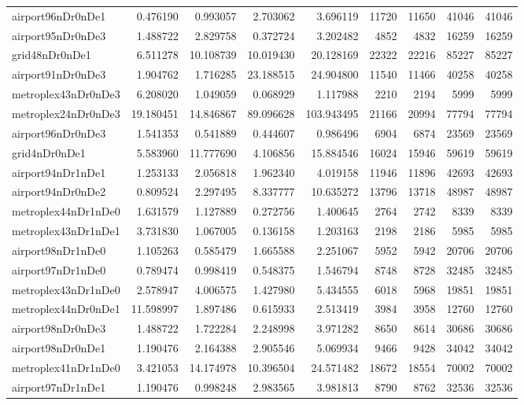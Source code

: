 \begin{longtable}{|l|r|r|r|r|r|r|r|r|}
airport96nDr0nDe1 & 0.476190 & 0.993057 & 2.703062 & 3.696119 & 11720 & 11650 & 41046 & 41046 \\
airport95nDr0nDe3 & 1.488722 & 2.829758 & 0.372724 & 3.202482 & 4852 & 4832 & 16259 & 16259 \\
grid48nDr0nDe1 & 6.511278 & 10.108739 & 10.019430 & 20.128169 & 22322 & 22216 & 85227 & 85227 \\
airport91nDr0nDe3 & 1.904762 & 1.716285 & 23.188515 & 24.904800 & 11540 & 11466 & 40258 & 40258 \\
metroplex43nDr0nDe3 & 6.208020 & 1.049059 & 0.068929 & 1.117988 & 2210 & 2194 & 5999 & 5999 \\
metroplex24nDr0nDe3 & 19.180451 & 14.846867 & 89.096628 & 103.943495 & 21166 & 20994 & 77794 & 77794 \\
airport96nDr0nDe3 & 1.541353 & 0.541889 & 0.444607 & 0.986496 & 6904 & 6874 & 23569 & 23569 \\
grid4nDr0nDe1 & 5.583960 & 11.777690 & 4.106856 & 15.884546 & 16024 & 15946 & 59619 & 59619 \\
airport94nDr1nDe1 & 1.253133 & 2.056818 & 1.962340 & 4.019158 & 11946 & 11896 & 42693 & 42693 \\
airport94nDr0nDe2 & 0.809524 & 2.297495 & 8.337777 & 10.635272 & 13796 & 13718 & 48987 & 48987 \\
metroplex44nDr1nDe0 & 1.631579 & 1.127889 & 0.272756 & 1.400645 & 2764 & 2742 & 8339 & 8339 \\
metroplex43nDr1nDe1 & 3.731830 & 1.067005 & 0.136158 & 1.203163 & 2198 & 2186 & 5985 & 5985 \\
airport98nDr1nDe0 & 1.105263 & 0.585479 & 1.665588 & 2.251067 & 5952 & 5942 & 20706 & 20706 \\
airport97nDr1nDe0 & 0.789474 & 0.998419 & 0.548375 & 1.546794 & 8748 & 8728 & 32485 & 32485 \\
metroplex43nDr1nDe0 & 2.578947 & 4.006575 & 1.427980 & 5.434555 & 6018 & 5968 & 19851 & 19851 \\
metroplex44nDr0nDe1 & 11.598997 & 1.897486 & 0.615933 & 2.513419 & 3984 & 3958 & 12760 & 12760 \\
airport98nDr0nDe3 & 1.488722 & 1.722284 & 2.248998 & 3.971282 & 8650 & 8614 & 30686 & 30686 \\
airport98nDr0nDe1 & 1.190476 & 2.164388 & 2.905546 & 5.069934 & 9466 & 9428 & 34042 & 34042 \\
metroplex41nDr1nDe0 & 3.421053 & 14.174978 & 10.396504 & 24.571482 & 18672 & 18554 & 70002 & 70002 \\
airport97nDr1nDe1 & 1.190476 & 0.998248 & 2.983565 & 3.981813 & 8790 & 8762 & 32536 & 32536 \\

\end{longtable}
